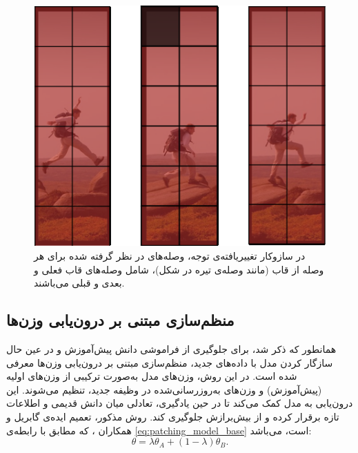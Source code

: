 ‌\begin{figure}
	\centering\includegraphics[scale=.50]{Images/Chapter3/openvclip_attention.png}
	\caption[وصله‌های در نظر گرفته شده برای هر وصله از قاب در سازوکار تغییریافته‌ی توجه]{در سازوکار تغییریافته‌ی توجه، وصله‌های در نظر گرفته شده برای هر وصله از قاب (مانند وصله‌ی تیره در شکل)، شامل وصله‌های قاب فعلی و بعدی و قبلی می‌باشند.}
	\label{fig.31}
\end{figure}

\subsection{منظم‌سازی مبتنی بر درون‌یابی وزن‌ها}
همانطور که ذکر شد، برای جلوگیری از فراموشی دانش پیش‌آموزش و در عین حال سازگار کردن مدل با داده‌های جدید، منظم‌سازی مبتنی بر درون‌یابی وزن‌ها معرفی شده است. در این روش، وزن‌های مدل به‌صورت ترکیبی از وزن‌های اولیه (پیش‌آموزش) و وزن‌های به‌روزرسانی‌شده در وظیفه جدید، تنظیم می‌شوند. این درون‌یابی به مدل کمک می‌کند تا در حین یادگیری، تعادلی میان دانش قدیمی و اطلاعات تازه برقرار کرده و از بیش‌برازش
  جلوگیری کند. روش مذکور، تعمیم ایده‌ی گابریل و همکاران
  \cite{patchingmodels}،
 که مطابق با رابطه‌ی \eqref{eq:patching_model_base} است، می‌باشد:
\begin{equation}\label{eq:patching_model_base}
\theta = \lambda \theta_A + (1 - \lambda) \theta_B.
\end{equation}

